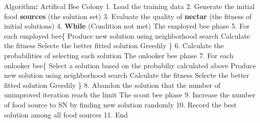 \documentclass[]{article}
\newenvironment{Shaded}{\begin{snugshade}}{\end{snugshade}}
\newcommand{\FloatTok}[1]{\textcolor[rgb]{0.00,0.00,0.81}{#1}}
\newcommand{\KeywordTok}[1]{\textcolor[rgb]{0.13,0.29,0.53}{\textbf{#1}}}
\newcommand{\NormalTok}[1]{#1}
\newcommand{\OperatorTok}[1]{\textcolor[rgb]{0.81,0.36,0.00}{\textbf{#1}}}
\newcommand{\StringTok}[1]{\textcolor[rgb]{0.31,0.60,0.02}{#1}}
\begin{document}
\begin{Shaded}
\begin{Highlighting}[]
\NormalTok{Algorithm}\OperatorTok{:}\StringTok{ }\NormalTok{Artifical Bee Colony}
 \FloatTok{1.}\NormalTok{ Load the training data}
 \FloatTok{2.}\NormalTok{ Generate the initial food }\KeywordTok{sources}\NormalTok{ (the solution set) }
 \FloatTok{3.}\NormalTok{ Evaluate the quality of }\KeywordTok{nectar}\NormalTok{ (the fitness of initial solutions)}
 \FloatTok{4.} \KeywordTok{While}\NormalTok{ (Condition not met)}
\NormalTok{        The employed bee phase}
 \FloatTok{5.}\NormalTok{     For each employed bee\{}
\NormalTok{          Produce new solution using neighborhood search}
\NormalTok{          Calculate the fitness}
\NormalTok{          Selecte the better fitted solution Greedily \}}
 \FloatTok{6.}\NormalTok{     Calculate the probabilities of selecting each solution}
\NormalTok{        The onlooker bee phase}
 \FloatTok{7.}\NormalTok{     For each onlooker bee\{  }
\NormalTok{          Select a solution based on the probabiliy calculated above}
\NormalTok{          Produce new solution using neighborhood search}
\NormalTok{          Calculate the fitness}
\NormalTok{          Selecte the better fitted solution Greedily \}}
 \FloatTok{8.}\NormalTok{     Abandon the solution that the number of unimproved iteration reach the limit}
\NormalTok{        The scout bee phase}
 \FloatTok{9.}\NormalTok{       Increase the number of food source to SN by finding new solution randomly}
\FloatTok{10.}\NormalTok{     Record the best solution among all food sources}
\FloatTok{11.}\NormalTok{ End}
\end{Highlighting}
\end{Shaded}

\printbibliography
\end{document}
